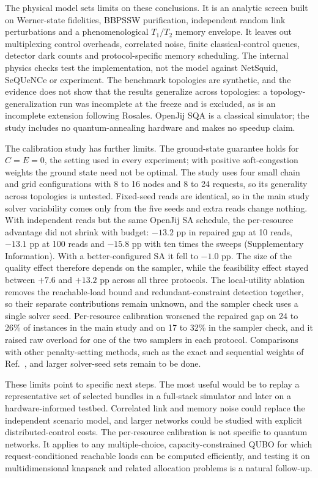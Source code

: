 \documentclass[pdflatex,sn-nature]{sn-jnl}
\theoremstyle{plain}
\theoremstyle{remark}
\begin{document}
The physical model sets limits on these conclusions. It is an analytic screen built on Werner-state fidelities, BBPSSW purification, independent random link perturbations and a phenomenological $T_1/T_2$ memory envelope. It leaves out multiplexing control overheads, correlated noise, finite classical-control queues, detector dark counts and protocol-specific memory scheduling. The internal physics checks test the implementation, not the model against NetSquid, SeQUeNCe or experiment. The benchmark topologies are synthetic, and the evidence does not show that the results generalize across topologies: a topology-generalization run was incomplete at the freeze and is excluded, as is an incomplete extension following Rosales. OpenJij SQA is a classical simulator; the study includes no quantum-annealing hardware and makes no speedup claim.

The calibration study has further limits. The ground-state guarantee holds for $C=E=0$, the setting used in every experiment; with positive soft-congestion weights the ground state need not be optimal. The study uses four small chain and grid configurations with 8 to 16 nodes and 8 to 24 requests, so its generality across topologies is untested. Fixed-seed reads are identical, so in the main study solver variability comes only from the five seeds and extra reads change nothing. With independent reads but the same OpenJij SA schedule, the per-resource advantage did not shrink with budget: $-13.2$ pp in repaired gap at 10 reads, $-13.1$ pp at 100 reads and $-15.8$ pp with ten times the sweeps (Supplementary Information). With a better-configured SA it fell to $-1.0$ pp. The size of the quality effect therefore depends on the sampler, while the feasibility effect stayed between $+7.6$ and $+13.2$ pp across all three protocols. The local-utility ablation removes the reachable-load bound and redundant-constraint detection together, so their separate contributions remain unknown, and the sampler check uses a single solver seed. Per-resource calibration worsened the repaired gap on 24 to 26\% of instances in the main study and on 17 to 32\% in the sampler check, and it raised raw overload for one of the two samplers in each protocol. Comparisons with other penalty-setting methods, such as the exact and sequential weights of Ref.~\cite{diez2022}, and larger solver-seed sets remain to be done.

These limits point to specific next steps. The most useful would be to replay a representative set of selected bundles in a full-stack simulator and later on a hardware-informed testbed. Correlated link and memory noise could replace the independent scenario model, and larger networks could be studied with explicit distributed-control costs. The per-resource calibration is not specific to quantum networks. It applies to any multiple-choice, capacity-constrained QUBO for which request-conditioned reachable loads can be computed efficiently, and testing it on multidimensional knapsack and related allocation problems is a natural follow-up.
\end{document}
